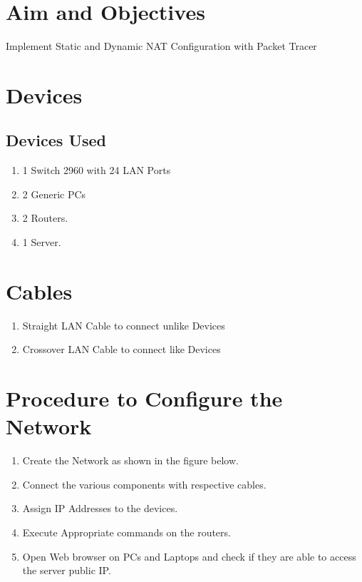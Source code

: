 \documentclass[11pt]{article}
\begin{document}
	
\tableofcontents
\thispagestyle{empty}
\clearpage


\setcounter{page}{1}

\section{Aim and Objectives}
Implement Static and Dynamic NAT Configuration with Packet Tracer

\section{Devices}

\subsection{Devices Used}
\begin{enumerate}
	\item 1 Switch 2960 with 24 LAN Ports
	\item 2 Generic PCs
	\item 2 Routers.
	\item 1 Server. 
\end{enumerate}

\section{Cables}
\begin{enumerate}
	\item Straight LAN Cable to connect unlike Devices
	\item Crossover LAN Cable to connect like Devices
\end{enumerate}

\section{Procedure to Configure the Network}

\begin{enumerate}
	\item Create the Network as shown in the figure below.
	\item Connect the various components with respective cables. 
	\item Assign IP Addresses to the devices. 
	\item Execute Appropriate commands on the routers. 
	\item Open Web browser on PCs and Laptops and check if they are able to access the server public IP. 
\end{enumerate}
\end{document}
